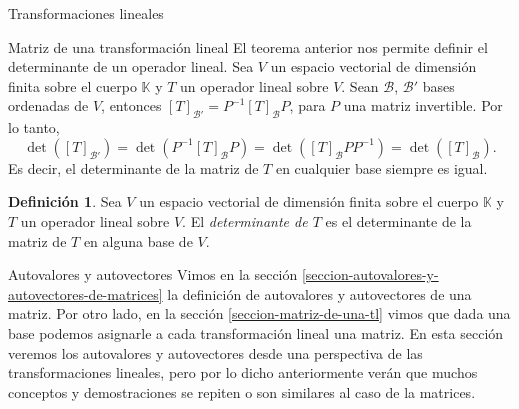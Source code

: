 \documentclass[a4paper,12pt,twoside,spanish,reqno]{amsbook}
\numberwithin{equation}{section}
\theoremstyle{definition}
\newtheorem{definicion}[teorema]{Definici\'on}
\theoremstyle{remark}
\newcommand{\K}{\mathbb K}
\begin{document}
\begin{chapter}{Transformaciones lineales}
\begin{section}{Matriz de una transformación lineal}
        El teorema anterior nos permite definir el determinante de un operador lineal.	Sea $V$ un espacio vectorial de dimensión finita sobre el cuerpo $\K$ y $T$ un operador lineal sobre $V$. Sean  $\mathcal B$, $\mathcal B'$ 
        bases ordenadas de $V$, entonces $[T]_{\mathcal B'} = P^{-1}[T]_{\mathcal B}P$, para $P$ una matriz invertible. Por lo tanto, 
        \begin{equation*}
            \det([T]_{\mathcal B'}) = \det(P^{-1}[T]_{\mathcal B}  P) =  \det([T]_{\mathcal B}  PP^{-1}) =  \det([T]_{\mathcal B}). 
        \end{equation*}
        Es decir,  el determinante de la matriz de $T$ en cualquier base siempre es igual.
        
        \begin{definicion} 
                Sea $V$ un espacio vectorial de dimensión finita sobre el cuerpo $\K$ y $T$ un operador lineal sobre $V$. El \textit{determinante de $T$} es el determinante de la matriz de $T$ en alguna base de $V$.  
        \end{definicion}
        \end{section}
    
    
    
    
    
    
    
        \begin{section}{Autovalores y autovectores}\label{seccion-autovalores-y-autovectores-de-una-tl}
        Vimos en la sección  \ref{seccion-autovalores-y-autovectores-de-matrices} la definición de autovalores y autovectores de una matriz. Por otro lado,  en la sección \ref{seccion-matriz-de-una-tl} vimos que dada una base podemos asignarle a cada transformación lineal una matriz. En  esta sección veremos los autovalores y autovectores desde una perspectiva de las transformaciones lineales, pero por lo dicho anteriormente  verán que muchos conceptos y demostraciones se repiten o son similares al caso de la matrices. 
        

\end{section}
\end{chapter}
\end{document}
